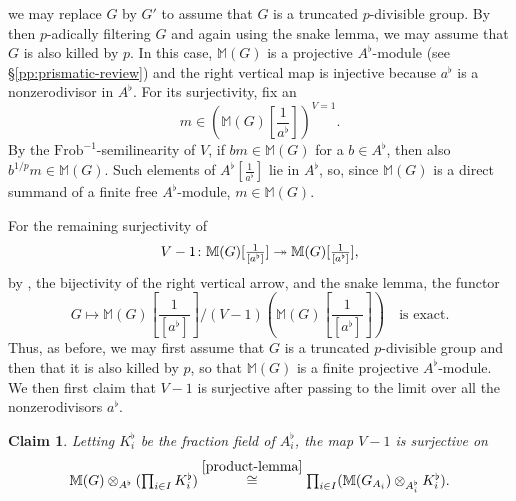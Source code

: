 \documentclass[11pt, reqno]{amsart}
\newcommand{\bM}{\mathbb{M}}
\newcommand{\Frob}{\mathrm{Frob}}			%
\renewcommand{\i}{^{-1}}
\newcommand{\isomto}{\overset{\sim}{\longrightarrow}}
\newcommand{\surjects}{\twoheadrightarrow}
\newcommand{\tensor}{\otimes} 			%
\providecommand{\f}[2]{\frac{#1}{#2}}
\newcommand{\bcl}{\begin{claim}}
\newcommand{\ecl}{\end{claim}}
\newcommand{\x}{\text}
\providecommand{\qx}[1]{\quad\text{#1}}
\newcommand{\tst}{\textstyle}
\numberwithin{equation}{numberingbase}
\theoremstyle{thms}
\theoremstyle{claims}
\newtheorem{claim}[equation]{Claim}
\theoremstyle{defs}
\theoremstyle{thms}
\theoremstyle{defs}
\theoremstyle{subsection-tweak}
\theoremstyle{subsection-tweak}
\begin{document}
we may replace $G$ by $G'$ to assume that $G$ is a truncated $p$-divisible group. By then $p$-adically filtering $G$ and again using the snake lemma, we may assume that $G$ is also killed by $p$. In this case, $\bM(G)$ is a projective $A^\flat$-module (see \S\ref{pp:prismatic-review}) and the right vertical map is injective because $a^\flat$ is a nonzerodivisor in $A^\flat$. %
For its surjectivity, fix an 
\[
\tst m \in (\bM(G)[\f 1{a^\flat}])^{V = 1}.
\]
By the $\Frob\i$-semilinearity of $V$, if $bm \in \bM(G)$ for a $b \in A^\flat$, then also $b^{1/p}m \in \bM(G)$. Such elements of $A^\flat[\f 1{a^\flat}]$ lie in $A^\flat$, so, since $\bM(G)$ is a direct summand of a finite free $A^\flat$-module, $m \in \bM(G)$. %
  

For the remaining surjectivity of 
\[
\tst \tst V - 1 \colon \bM(G)[\f 1{[a^\flat]}] \surjects \bM(G)[\f 1{[a^\flat]}],
\]
by , the bijectivity of the right vertical arrow, %
and the snake lemma, the functor 
\[
\tst G \mapsto \bM(G)[\f 1{[a^\flat]}]/(V - 1)(\bM(G)[\f 1{[a^\flat]}]) \qx{is exact.}
\]
Thus, as before, we may first assume that $G$ is a truncated $p$-divisible group and then that it is also killed by $p$, so that $\bM(G)$ is a finite projective $A^\flat$-module. We then first claim that $V - 1$ is surjective after passing to the limit over all the nonzerodivisors   $a^\flat$.

\bcl \label{first-claim}
Letting $K_i^\flat$ be the fraction field of $A_i^\flat$, the map $V - 1$ is surjective on
\[
\tst \bM(G) \tensor_{A^\flat} (\prod_{i \in I} K_i^\flat) \overset{\ref{product-lemma}}{\cong}  \prod_{i \in I} (\bM(G_{A_i}) \tensor_{A_i^\flat} K_i^\flat).
\] 
\ecl
\end{document}
